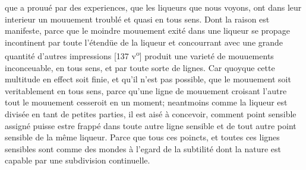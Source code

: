 
 \pstart {}
 que \protect{} a prouu\'{e} par des experiences, que les liqueurs que nous voyons, ont dans leur interieur un mouuement troubl\'{e} et quasi en tous sens. Dont la raison est manifeste, parce que le moindre mouuement exit\'{e} dans une liqueur se propage incontinent par toute l'\'{e}tend\"{u}e de la liqueur et concourrant avec une grande quantit\'{e} d'autres impressions
 [137 v\textsuperscript{o}] produit une variet\'{e} de mouuements inconceuable, en tous sens, et par toute sorte de lignes. Car quoyque cette multitude en effect soit finie, et qu'il n'est pas possible, que le mouuement soit veritablement  en tous sens, parce qu'une ligne de mouuement croisant l'autre tout le mouuement cesseroit en un moment; neantmoins comme la liqueur est divis\'{e}e en tant de petites parties, il est ais\'{e} \`{a} concevoir, comment  point sensible assign\'{e} puisse estre frapp\'{e} dans toute autre ligne sensible et de tout autre point sensible de la m\^{e}me liqueur. Parce que tous ces poincts, et toutes ces lignes sensibles sont comme des mondes\protect{} \`{a} l'egard de la subtilit\'{e} dont la nature est capable par une subdivision continuelle.
\pend 
